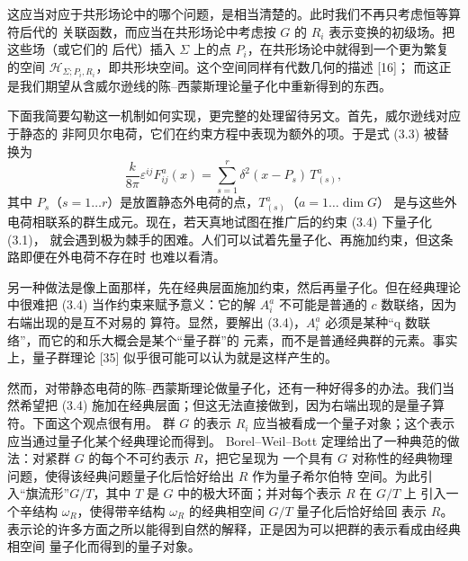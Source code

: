 \documentclass[11pt,a4paper]{article}
\begin{document}
这应当对应于共形场论中的哪个问题，是相当清楚的。此时我们不再只考虑恒等算符后代的
关联函数，而应当在共形场论中考虑按 $G$ 的 $R_i$ 表示变换的初级场。把这些场（或它们的
后代）插入 $\Sigma$ 上的点 $P_i$，在共形场论中就得到一个更为繁复的空间
$\mathcal{H}_{\Sigma;P_i,R_i}$，即共形块空间。这个空间同样有代数几何的描述 [16]；
而这正是我们期望从含威尔逊线的陈–西蒙斯理论量子化中重新得到的东西。

下面我简要勾勒这一机制如何实现，更完整的处理留待另文。首先，威尔逊线对应于静态的
非阿贝尔电荷，它们在约束方程中表现为额外的项。于是式 (3.3) 被替换为
\begin{equation}
    \frac{k}{8\pi}\varepsilon^{ij}F^{a}_{ij}(x)=\sum_{s=1}^{r}\delta^{2}(x-P_s)\,T^{a}_{(s)},
    \tag{3.4}
\end{equation}
其中 $P_s$（$s=1\ldots r$）是放置静态外电荷的点，$T^{a}_{(s)}$（$a=1\ldots\dim G$）
是与这些外电荷相联系的群生成元。现在，若天真地试图在推广后的约束 (3.4) 下量子化 (3.1)，
就会遇到极为棘手的困难。人们可以试着先量子化、再施加约束，但这条路即便在外电荷不存在时
也难以看清。


另一种做法是像上面那样，先在经典层面施加约束，然后再量子化。但在经典理论中很难把 (3.4)
当作约束来赋予意义：它的解 $A_i^a$ 不可能是普通的 $c$ 数联络，因为右端出现的是互不对易的
算符。显然，要解出 (3.4)，$A_i^a$ 必须是某种“q 数联络”，而它的和乐大概会是某个“量子群”的
元素，而不是普通经典群的元素。事实上，量子群理论 [35] 似乎很可能可以认为就是这样产生的。

然而，对带静态电荷的陈–西蒙斯理论做量子化，还有一种好得多的办法。我们当然希望把 (3.4)
施加在经典层面；但这无法直接做到，因为右端出现的是量子算符。下面这个观点很有用。
群 $G$ 的表示 $R_i$ 应当被看成一个量子对象；这个表示应当通过量子化某个经典理论而得到。
Borel–Weil–Bott 定理给出了一种典范的做法：对紧群 $G$ 的每个不可约表示 $R$，把它呈现为
一个具有 $G$ 对称性的经典物理问题，使得该经典问题量子化后恰好给出 $R$ 作为量子希尔伯特
空间。为此引入“旗流形”$G/T$，其中 $T$ 是 $G$ 中的极大环面；并对每个表示 $R$ 在 $G/T$ 上
引入一个辛结构 $\omega_R$，使得带辛结构 $\omega_R$ 的经典相空间 $G/T$ 量子化后恰好给回
表示 $R$。表示论的许多方面之所以能得到自然的解释，正是因为可以把群的表示看成由经典相空间
量子化而得到的量子对象。
\end{document}
